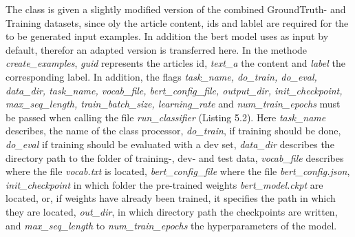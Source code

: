 \documentclass[a4paper, 11pt,titlepage,oneside,openany]{book}
\begin{document}
The class is given a slightly modified version of the combined GroundTruth- and Training datasets, since oly the article content, ids and lablel are required for the to be generated input examples. In addition the \gls{bert} model uses  as input by default, therefor an adapted version is transferred here. In the methode \textit{create\_examples}, \textit{guid} represents the articles id, \textit{text\_a} the content and \textit{label} the corresponding label. In addition, the flags \textit{task\_name, do\_train, do\_eval, data\_dir, task\_name, vocab\_file, bert\_config\_file, output\_dir, init\_checkpoint, max\_seq\_length, train\_batch\_size, learning\_rate} and \textit{num\_train\_epochs} must be passed when calling the file \textit{run\_classifier} (Listing 5.2). Here \textit{task\_name} describes, the name of the class processor, \textit{do\_train}, if training should be done, \textit{do\_eval} if training should be evaluated with a dev set, \textit{data\_dir} describes the directory path to the folder of training-, dev- and test data, \textit{vocab\_file} describes where the file \textit{vocab.txt} is located, \textit{bert\_config\_file} where the file \textit{bert\_config.json},  \textit{init\_checkpoint} in which folder the pre-trained weights \textit{bert\_model.ckpt} are located, or, if weights have already been trained, it specifies the path in which they are located, \textit{out\_dir}, in which directory path the checkpoints are written, and \textit{max\_seq\_length} to \textit{num\_train\_epochs} the hyperparameters of the model.
 
\end{document}
